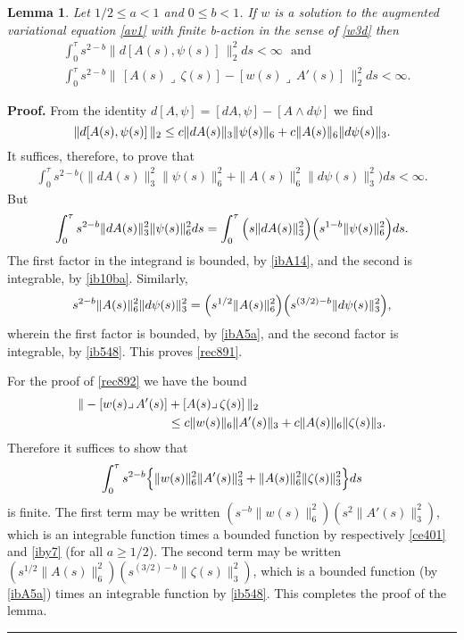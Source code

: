 \documentclass[12pt]{article}
\newtheorem{lemma}[theorem]{Lemma}
\newenvironment{proof}[1][Proof]{\textbf{#1.} }{\ \rule{0.5em}{0.5em}}
\def \({\Big(}
\def \){\Big)}
\def \beq{\begin{equation}}
\def \eeq{\end{equation}}
\def \eref{\eqref}
\def \lrc{\lrcorner\,}
\numberwithin{equation}{section}
\begin{document}
\begin{lemma} \label{lemrec9cd}   
  Let $1/2 \le a < 1$ and $0 \le b <1$.
   If $w$ is a solution to the augmented variational equation \eref{av1} with 
    finite b-action in the sense of \eref{w3d}  then 
\begin{align}
&\int_0^\tau s^{2-b}  \|d [A(s),\psi(s)]\, \|_2^2 ds < \infty \ \ \ \text{and}     \label{rec891} \\
& \int_0^\tau s^{2-b} \|\,  [ A(s)\lrc  \zeta(s)]     - [w(s)\lrc A'(s)]\,   \|_2^2 ds 
                  < \infty .         \label{rec892}
\end{align}
\end{lemma}
\begin{proof}
From the identity  $d[A,\psi] = [dA, \psi] - [A\wedge d\psi]$ 
  we find
 \beq
  \|d [A(s),\psi(s)]\, \|_2 \le   c\|dA(s)\|_3 \| \psi(s)\|_6 +c\|A(s)\|_6 \|d\psi(s)\|_3.  \notag
  \eeq
  It suffices, therefore, to prove that
 \begin{align}
 \int_0^\tau s^{2-b}\Big(\|dA(s)\|_3^2 \| \psi(s)\|_6^2 
                   +\|A(s)\|_6^2 \|d\psi(s)\|_3^2  \) ds < \infty. \label{rec883c}
 \end{align}
 But 
 \begin{align}
 \int_0^\tau  s^{2-b}\|dA(s)\|_3^2 \| \psi(s)\|_6^2 ds 
               = \int_0^\tau \(s \|dA(s)\|_3^2\) \(s^{1-b} \| \psi(s)\|_6^2\)ds.     \notag
 \end{align}
 The first factor in the integrand is bounded, by \eref{ibA14}, and the
  second is integrable, by \eref{ib10ba}. 
  Similarly, 
  \beq
   s^{2-b}\|A(s)\|_6^2 \|d\psi(s)\|_3^2 = \(s^{1/2} \|A(s)\|_6^2\)\(s^{(3/2)- b}\|d\psi(s)\|_3^2 \), \notag
   \eeq
   wherein the first factor is bounded, by \eref{ibA5a}, and the second factor is integrable, by \eref{ib548}.
This proves \eref{rec891}.

For the proof of \eref{rec892} we have the bound
 \begin{align}
 \|- [w(s)\lrc A'(s)]  &+[ A(s)\lrc  \zeta(s)]\, \|_2     \notag\\
&  \le c\|w(s)\|_6 \| A'(s)\|_3   +c \|A(s)\|_6 \|\zeta(s)\|_3.  \label{rec881ac} 
\end{align}
Therefore it suffices to show that
\begin{align}
\int_0^\tau s^{2-b}\Big\{ \|w(s)\|_6^2 \|A'(s)\|_3^2 
 + \|A(s)\|_6^2\|\zeta(s)\|_3^2   \Big\}ds  \notag
 \end{align}
 is finite. The first term may be written $(s^{-b}\|w(s)\|_6^2) ( s^2\|A'(s)\|_3^2)$, which is an integrable function
 times a bounded function by respectively \eref{ce401} and \eref{iby7} (for all $a \ge 1/2$). 
 The second term may  be written $(s^{1/2} \| A(s)\|_6^2) ( s^{(3/2) -b} \|\zeta(s)\|_3^2)$,
 which is a bounded function (by \eref{ibA5a}) times an integrable function by \eref{ib548}.
This completes the proof of the lemma.
\end{proof}
\end{document}
